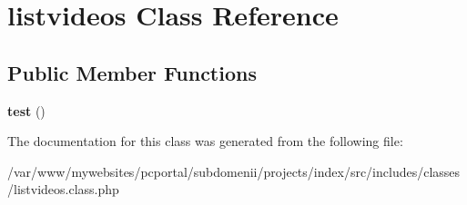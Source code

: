 \hypertarget{classlistvideos}{
\section{\-l\-i\-s\-t\-v\-i\-d\-e\-o\-s \-C\-l\-a\-s\-s \-R\-e\-f\-e\-r\-e\-n\-c\-e}
\label{classlistvideos}
}
\subsection*{Public Member Functions}
\begin{DoxyCompactItemize}
\item 
\hypertarget{classlistvideos_a038ae411666eb2af53fea09ec9e2a70e}{
{\bfseries \-t\-e\-s\-t} \-(\-)}
\label{classlistvideos_a038ae411666eb2af53fea09ec9e2a70e}

\end{DoxyCompactItemize}


The documentation for this class was generated from the following file:\begin{DoxyCompactItemize}
\item 
\-/\-v\-a\-r\-/\-w\-w\-w\-/\-m\-y\-w\-e\-b\-s\-i\-t\-e\-s\-/\-p\-c\-p\-o\-r\-t\-a\-l\-/\-s\-u\-b\-d\-o\-m\-e\-n\-i\-i\-/\-p\-r\-o\-j\-e\-c\-t\-s\-/\-i\-n\-d\-e\-x\-/\-s\-r\-c\-/\-i\-n\-c\-l\-u\-d\-e\-s\-/\-c\-l\-a\-s\-s\-e\-s\-/\-l\-i\-s\-t\-v\-i\-d\-e\-o\-s\-.\-c\-l\-a\-s\-s\-.\-p\-h\-p\end{DoxyCompactItemize}
